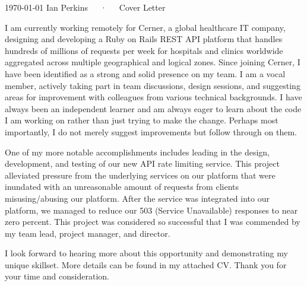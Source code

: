 \documentclass[11pt, a4paper]{awesome-cv}
\begin{document}
\makecvheader[C]

\makecvfooter
  {\today}
  {Ian Perkins~~~·~~~Cover Letter}
  {}

\makelettertitle

\begin{cvletter}

I am currently working remotely for Cerner, a global healthcare IT company, designing and developing a Ruby on Rails REST API platform that handles hundreds of millions of requests per week for hospitals and clinics worldwide aggregated across multiple geographical and logical zones. Since joining Cerner, I have been identified as a strong and solid presence on my team. I am a vocal member, actively taking part in team discussions, design sessions, and suggesting areas for improvement with colleagues from various technical backgrounds. I have always been an independent learner and am always eager to learn about the code I am working on rather than just trying to make the change. Perhaps most importantly, I do not merely suggest improvements but follow through on them.

One of my more notable accomplishments includes leading in the design, development, and testing of our new API rate limiting service. This project alleviated pressure from the underlying services on our platform that were inundated with an unreasonable amount of requests from clients misusing/abusing our platform. After the service was integrated into our platform, we managed to reduce our 503 (Service Unavailable) responses to near zero percent. This project was considered so successful that I was commended by my team lead, project manager, and director.

I look forward to hearing more about this opportunity and demonstrating my unique skillset. More details can be found in my attached CV. Thank you for your time and consideration.



\end{cvletter}
\end{document}
